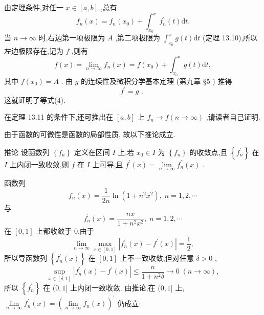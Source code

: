 由定理条件,对任一 \(x \in  \left\lbrack  {a,b}\right\rbrack\) ,总有
\[
{f}_{n}\left( x\right)  = {f}_{n}\left( {x}_{0}\right)  + {\int }_{{x}_{0}}^{x}{f}_{n}^{\prime }\left( t\right) \mathrm{d}t.
\]
当 \(n \rightarrow  \infty\) 时,右边第一项极限为 \(A\) ,第二项极限为 \({\int }_{{x}_{0}}^{x}g\left( t\right) \mathrm{d}t\) (定理 13.10),所以左边极限存在,记为 \(f\) ,则有
\[
f\left( x\right)  = \mathop{\lim }\limits_{{n \rightarrow  \infty }}{f}_{n}\left( x\right)  = f\left( {x}_{0}\right)  + {\int }_{{x}_{0}}^{x}g\left( t\right) \mathrm{d}t,
\]
其中 \(f\left( {x}_{0}\right)  = A\) . 由 \(g\) 的连续性及微积分学基本定理 (第九章 §5 ) 推得
\[
{f}^{\prime } = g\text{ . }
\]
这就证明了等式(4).

在定理 13.11 的条件下,还可推出在 \(\left\lbrack  {a,b}\right\rbrack\) 上 \({f}_{n} \rightarrow  f\left( {n \rightarrow  \infty }\right)\) ,请读者自己证明.

由于函数的可微性是函数的局部性质, 故以下推论成立.

推论 设函数列 \(\left\{  {f}_{n}\right\}\) 定义在区间 \(I\) 上,若 \({x}_{0} \in  I\) 为 \(\left\{  {f}_{n}\right\}\) 的收敛点,且 \(\left\{  {f}_{n}^{\prime }\right\}\) 在 \(I\) 上内闭一致收敛,则 \(f\) 在 \(I\) 上可导,且 \({f}^{\prime }\left( x\right)  = \mathop{\lim }\limits_{{n \rightarrow  \infty }}{f}_{n}^{\prime }\left( x\right)\) .

\begin{example}

\end{example}
函数列
\[
{f}_{n}\left( x\right)  = \frac{1}{2n}\ln \left( {1 + {n}^{2}{x}^{2}}\right) ,\;n = 1,2,\cdots
\]
与
\[
{f}_{n}^{\prime }\left( x\right)  = \frac{nx}{1 + {n}^{2}{x}^{2}},\;n = 1,2,\cdots
\]
在 \(\left\lbrack  {0,1}\right\rbrack\) 上都收敛于 0,由于
\[
\mathop{\lim }\limits_{{n \rightarrow  \infty }}\mathop{\max }\limits_{{x \in  \left\lbrack  {0,1}\right\rbrack  }}\left| {{f}_{n}^{\prime }\left( x\right)  - {f}^{\prime }\left( x\right) }\right|  = \frac{1}{2},
\]
所以导函数列 \(\left\{  {{f}_{n}^{\prime }\left( x\right) }\right\}\) 在 \(\left\lbrack  {0,1}\right\rbrack\) 上不一致收敛,但对任意 \(\delta  > 0\) ,
\[
\mathop{\sup }\limits_{{x \in  \left\lbrack  {\delta ,1}\right\rbrack  }}\left| {{f}_{n}^{\prime }\left( x\right)  - {f}^{\prime }\left( x\right) }\right|  \leq  \frac{n}{1 + {n}^{2}\delta } \rightarrow  0\;\left( {n \rightarrow  \infty }\right) ,
\]
所以 \(\left\{  {f}_{n}^{\prime }\right\}\) 在 \((0,1\rbrack\) 上内闭一致收敛. 由推论,在 \((0,1\rbrack\) 上, \(\mathop{\lim }\limits_{{n \rightarrow  \infty }}{f}_{n}^{\prime }\left( x\right)  = {\left( \mathop{\lim }\limits_{{n \rightarrow  \infty }}{f}_{n}\left( x\right) \right) }^{\prime }\) 仍成立.

